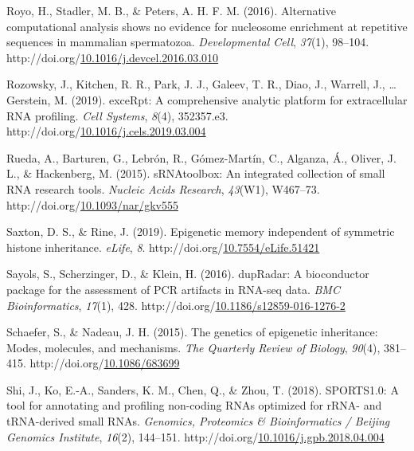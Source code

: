 \documentclass[12pt,twoside]{reedthesis}
\newlength{\cslhangindent}
\newenvironment{CSLReferences}[2] %
 {%
  \setlength{\parindent}{0pt}
  \ifodd #1 \everypar{\setlength{\hangindent}{\cslhangindent}}\ignorespaces\fi
  \ifnum #2 > 0
  \setlength{\parskip}{#2\baselineskip}
  \fi
 }%
 {}
\begin{document}
\begin{CSLReferences}{1}{0}
\leavevmode{}%
Royo, H., Stadler, M. B., \& Peters, A. H. F. M. (2016). Alternative computational analysis shows no evidence for nucleosome enrichment at repetitive sequences in mammalian spermatozoa. \emph{Developmental Cell}, \emph{37}(1), 98--104. http://doi.org/\href{https://doi.org/10.1016/j.devcel.2016.03.010}{10.1016/j.devcel.2016.03.010}

\leavevmode{}%
Rozowsky, J., Kitchen, R. R., Park, J. J., Galeev, T. R., Diao, J., Warrell, J., \ldots{} Gerstein, M. (2019). exceRpt: A comprehensive analytic platform for extracellular RNA profiling. \emph{Cell Systems}, \emph{8}(4), 352357.e3. http://doi.org/\href{https://doi.org/10.1016/j.cels.2019.03.004}{10.1016/j.cels.2019.03.004}

\leavevmode{}%
Rueda, A., Barturen, G., Lebrón, R., Gómez-Martín, C., Alganza, Á., Oliver, J. L., \& Hackenberg, M. (2015). sRNAtoolbox: An integrated collection of small RNA research tools. \emph{Nucleic Acids Research}, \emph{43}(W1), W467--73. http://doi.org/\href{https://doi.org/10.1093/nar/gkv555}{10.1093/nar/gkv555}

\leavevmode{}%
Saxton, D. S., \& Rine, J. (2019). Epigenetic memory independent of symmetric histone inheritance. \emph{eLife}, \emph{8}. http://doi.org/\href{https://doi.org/10.7554/eLife.51421}{10.7554/eLife.51421}

\leavevmode{}%
Sayols, S., Scherzinger, D., \& Klein, H. (2016). dupRadar: A bioconductor package for the assessment of PCR artifacts in RNA-seq data. \emph{BMC Bioinformatics}, \emph{17}(1), 428. http://doi.org/\href{https://doi.org/10.1186/s12859-016-1276-2}{10.1186/s12859-016-1276-2}

\leavevmode{}%
Schaefer, S., \& Nadeau, J. H. (2015). The genetics of epigenetic inheritance: Modes, molecules, and mechanisms. \emph{The Quarterly Review of Biology}, \emph{90}(4), 381--415. http://doi.org/\href{https://doi.org/10.1086/683699}{10.1086/683699}

\leavevmode{}%
Shi, J., Ko, E.-A., Sanders, K. M., Chen, Q., \& Zhou, T. (2018). SPORTS1.0: A tool for annotating and profiling non-coding RNAs optimized for rRNA- and tRNA-derived small RNAs. \emph{Genomics, Proteomics \& Bioinformatics / Beijing Genomics Institute}, \emph{16}(2), 144--151. http://doi.org/\href{https://doi.org/10.1016/j.gpb.2018.04.004}{10.1016/j.gpb.2018.04.004}


\end{CSLReferences}
\end{document}
